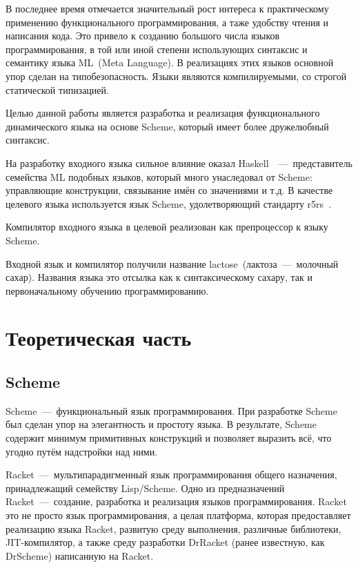 \documentclass[12pt,a4paper,oneside]{extarticle}
\begin{document}
    В последнее время отмечается значительный рост интереса к практическому применению функционального программирования, а таже удобству чтения и написания кода.
    Это привело к созданию большого числа языков программирования, в той или иной степени использующих синтаксис и семантику языка ML~(Meta Language).
    В реализациях этих языков основной упор сделан на типобезопасность.
    Языки являются компилируемыми, со строгой статической типизацией.

    Целью данной работы является разработка и реализация функционального динамического языка на основе Scheme, который имеет более дружелюбный синтаксис.

    На разработку входного языка сильное влияние оказал Haskell~\cite{haskell}~---~представитель семейства ML подобных языков, который много унаследовал от Scheme: управляющие конструкции, связывание имён со значениями и т.д.
    В качестве целевого языка используется язык Scheme, удолетворяющий стандарту r5rs~\cite{r5rs}.

    Компилятор входного языка в целевой реализован как препроцессор к языку Scheme.

    Входной язык и компилятор получили название lactose~(лактоза~---~молочный сахар).
    Названия языка это отсылка как к синтаксическому сахару, так и первоначальному обучению программированию.
\clearpage

\section{Теоретическая часть}
    \subsection{Scheme}
        Scheme~---~функциональный язык программирования.
        При разработке Scheme был сделан упор на элегантность и простоту языка.
        В результате, Scheme содержит минимум примитивных конструкций и позволяет выразить всё, что угодно путём надстройки над ними.

        Racket~---~мультипарадигменный язык программирования общего назначения, принадлежащий семейству Lisp/Scheme.
        Одно из предназначений Racket~---~создание, разработка и реализация языков программирования.
        Racket это не просто язык программирования, а целая платформа, которая предоставляет реализацию языка Racket, развитую среду выполнения, различные библиотеки, JIT-компилятор, а также среду разработки DrRacket (ранее известную, как DrScheme) написанную на Racket.
\end{document}
